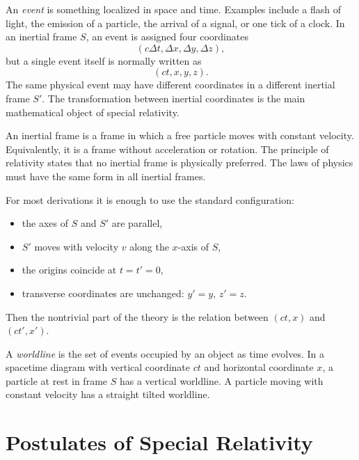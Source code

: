 An \emph{event} is something localized in space and time.  Examples include a
flash of light, the emission of a particle, the arrival of a signal, or one tick
of a clock.  In an inertial frame \(S\), an event is assigned four coordinates
\[
( c\Delta t,\Delta x,\Delta y,\Delta z),
\]
but a single event itself is normally written as
\[
(ct,x,y,z).
\]
The same physical event may have different coordinates in a different inertial
frame \(S'\).  The transformation between inertial coordinates is the main
mathematical object of special relativity.

An inertial frame is a frame in which a free particle moves with constant
velocity.  Equivalently, it is a frame without acceleration or rotation.  The
principle of relativity states that no inertial frame is physically preferred.
The laws of physics must have the same form in all inertial frames.

For most derivations it is enough to use the standard configuration:
\begin{itemize}
    \item the axes of \(S\) and \(S'\) are parallel,
    \item \(S'\) moves with velocity \(v\) along the \(x\)-axis of \(S\),
    \item the origins coincide at \(t=t'=0\),
    \item transverse coordinates are unchanged: \(y'=y\), \(z'=z\).
\end{itemize}
Then the nontrivial part of the theory is the relation between \((ct,x)\) and
\((ct',x')\).

\begin{definitionbox}
A \emph{worldline} is the set of events occupied by an object as time evolves.
In a spacetime diagram with vertical coordinate \(ct\) and horizontal coordinate
\(x\), a particle at rest in frame \(S\) has a vertical worldline.  A particle
moving with constant velocity has a straight tilted worldline.
\end{definitionbox}

\begin{center}
\end{center}

\clearpage

\section{Postulates of Special Relativity}

